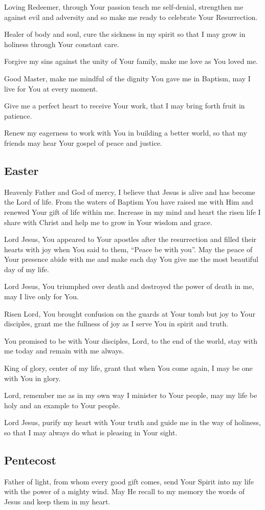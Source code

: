 \documentclass[12pt]{article}
\newcommand{\prayertitle}[1]{\subsection{#1}}
\begin{document}
Loving Redeemer, through Your passion teach me self-denial, strengthen me against evil and adversity and so make me ready to celebrate Your Resurrection.

Healer of body and soul, cure the sickness in my spirit so that I may grow in holiness through Your constant care.

Forgive my sins against the unity of Your family, make me love as You loved me.

Good Master, make me mindful of the dignity You gave me in Baptism, may I live for You at every moment.

Give me a perfect heart to receive Your work, that I may bring forth fruit in patience.

Renew my eagerness to work with You in building a better world, so that my friends may hear Your gospel of peace and justice.

\prayertitle{Easter}
Heavenly Father and God of mercy, I believe that Jesus is alive and has become the Lord of life.
From the waters of Baptism You have raised me with Him and renewed Your gift of life within me.
Increase in my mind and heart the risen life I share with Christ and help me to grow in Your wisdom and grace.

Lord Jesus, You appeared to Your apostles after the resurrection and filled their hearts with joy when You said to them, ``Peace be with you''.
May the peace of Your presence abide with me and make each day You give me the most beautiful day of my life.

Lord Jesus, You triumphed over death and destroyed the power of death in me, may I live only for You.

Risen Lord, You brought confusion on the guards at Your tomb but joy to Your disciples, grant me the fullness of joy as I serve You in spirit and truth.

You promised to be with Your disciples, Lord, to the end of the world, stay with me today and remain with me always.

King of glory, center of my life, grant that when You come again, I may be one with You in glory.

Lord, remember me as in my own way I minister to Your people, may my life be holy and an example to Your people.

Lord Jesus, purify my heart with Your truth and guide me in the way of holiness, so that I may always do what is pleasing in Your sight.

\prayertitle{Pentecost}
Father of light, from whom every good gift comes, send Your Spirit into my life with the power of a mighty wind.
May He recall to my memory the words of Jesus and keep them in my heart.
\end{document}
